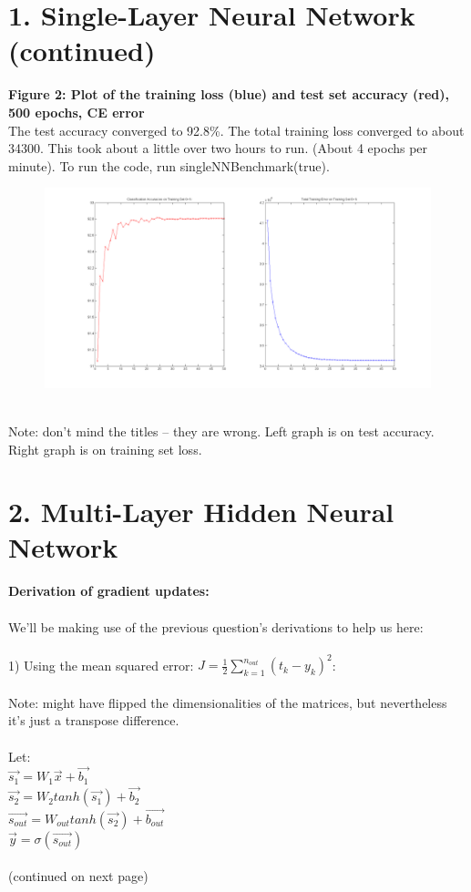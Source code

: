 \documentclass[11pt]{article}
\begin{document}
\section*{1. Single-Layer Neural Network (continued)}
\textbf{Figure 2: Plot of the training loss (blue) and test set accuracy (red), 500 epochs, CE error} \\
The test accuracy converged to 92.8\%. The total training loss converged to about 34300. This took about a little over two hours to run. (About 4 epochs per minute). To run the code, run singleNNBenchmark(true).
\\
\begin{figure}[ht!]
\centering
\includegraphics[width=180mm]{plots/finalp1ce.png}
\label{overflow}
\end{figure}
\\
Note: don't mind the titles -- they are wrong. Left graph is on test accuracy. Right graph is on training set loss.

\section*{2. Multi-Layer Hidden Neural Network}
\textbf{ Derivation of gradient updates:}
\\\\
We'll be making use of the previous question's derivations to help us here:
\\\\
1) Using the mean squared error: $J = \frac{1}{2} \sum_{k=1}^{n_{out}} (t_k - y_k)^2 $:
\\\\
Note: might have flipped the dimensionalities of the matrices, but nevertheless it's just a transpose difference.
\\\\
Let: \\
$ \vec{s_1} = W_1 \vec{x} + \vec{b_1} $ \\
$ \vec{s_2} = W_2 tanh(\vec{s_1}) + \vec{b_2} $ \\
$ \vec{s_{out}} = W_{out} tanh ( \vec{s_2}) + \vec{b_{out}} $ \\
$ \vec{y} = \sigma (\vec{s_{out}}) $
\\\\
(continued on next page)
\newpage
\end{document}
